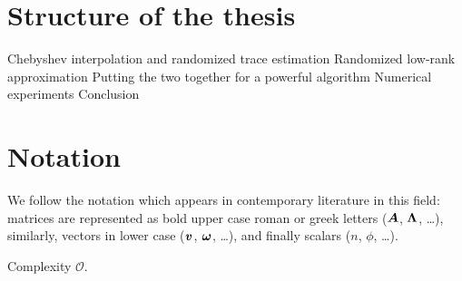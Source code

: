 
\section{Structure of the thesis}
\label{sec:1-introduction-structure}

Chebyshev interpolation and randomized trace estimation 
Randomized low-rank approximation 
Putting the two together for a powerful algorithm 
Numerical experiments 
Conclusion 


\section{Notation}
\label{sec:1-introduction-notation}

We follow the notation which appears in contemporary literature in this field:
matrices are represented as bold upper case roman or greek letters ($\boldsymbol{A}$, $\boldsymbol{\Lambda}$, \dots), 
similarly, vectors in lower case ($\boldsymbol{v}$, $\boldsymbol{\omega}$, \dots), and finally
scalars ($n$, $\phi$, \dots).

Complexity $\mathcal{O}$.
